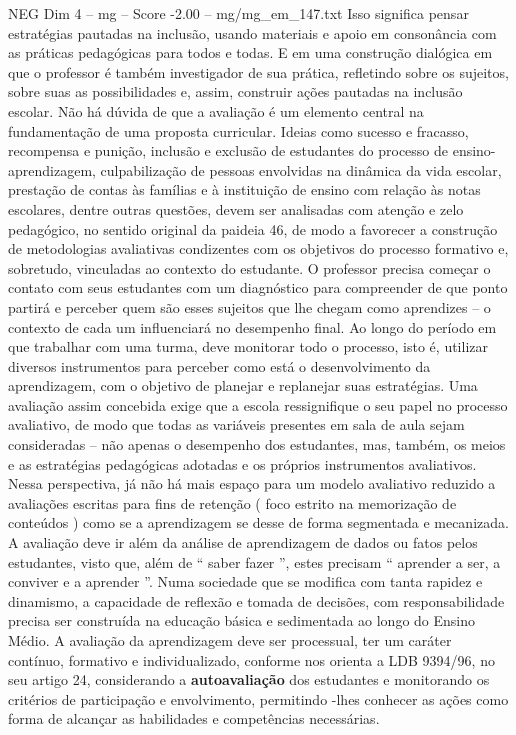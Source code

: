\begin{textsample}{NEG Dim 4 – mg – Score -2.00 – mg/mg\_em\_147.txt}
Isso significa pensar estratégias pautadas na inclusão, usando materiais e apoio em consonância com as práticas pedagógicas para todos e todas.
E em uma construção dialógica em que o professor é também investigador de sua prática, refletindo sobre os sujeitos, sobre suas as possibilidades e, assim, construir ações pautadas na inclusão escolar.
Não há dúvida de que a avaliação é um elemento central na fundamentação de uma proposta curricular.
Ideias como sucesso e fracasso, recompensa e punição, inclusão e exclusão de estudantes do processo de ensino-aprendizagem, culpabilização de pessoas envolvidas na dinâmica da vida escolar, prestação de contas às famílias e à instituição de ensino com relação às notas escolares, dentre outras questões, devem ser analisadas com atenção e zelo pedagógico, no sentido original da paideia 46, de modo a favorecer a construção de metodologias avaliativas condizentes com os objetivos do processo formativo e, sobretudo, vinculadas ao contexto do estudante.
O professor precisa começar o contato com seus estudantes com um diagnóstico para compreender de que ponto partirá e perceber quem são esses sujeitos que lhe chegam como aprendizes – o contexto de cada um influenciará no desempenho final.
Ao longo do período em que trabalhar com uma turma, deve monitorar todo o processo, isto é, utilizar diversos instrumentos para perceber como está o desenvolvimento da aprendizagem, com o objetivo de planejar e replanejar suas estratégias.
Uma avaliação assim concebida exige que a escola ressignifique o seu papel no processo avaliativo, de modo que todas as variáveis presentes em sala de aula sejam consideradas – não apenas o desempenho dos estudantes, mas, também, os meios e as estratégias pedagógicas adotadas e os próprios instrumentos avaliativos.
Nessa perspectiva, já não há mais espaço para um modelo avaliativo reduzido a avaliações escritas para fins de retenção ( foco estrito na memorização de conteúdos ) como se a aprendizagem se desse de forma segmentada e mecanizada.
A avaliação deve ir além da análise de aprendizagem de dados ou fatos pelos estudantes, visto que, além de “ saber fazer ”, estes precisam “ aprender a ser, a conviver e a aprender ”.
Numa sociedade que se modifica com tanta rapidez e dinamismo, a capacidade de reflexão e tomada de decisões, com responsabilidade precisa ser construída na educação básica e sedimentada ao longo do Ensino Médio.
A avaliação da aprendizagem deve ser processual, ter um caráter contínuo, formativo e individualizado, conforme nos orienta a LDB 9394/96, no seu artigo 24, considerando a \textbf{autoavaliação} dos estudantes e monitorando os critérios de participação e envolvimento, permitindo -lhes conhecer as ações como forma de alcançar as habilidades e competências necessárias.

\end{textsample}
